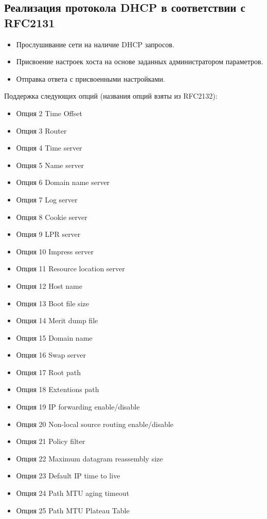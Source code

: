 \documentclass[14pt,a4paper]{extarticle}
\begin{document}
\subsection{Реализация протокола DHCP в соответствии с RFC2131}
\begin{itemize}
    \item Прослушивание сети на наличие DHCP запросов.
    \item Присвоение настроек хоста на основе заданных администратором параметров.
    \item Отправка ответа с присвоенными настройками.
\end{itemize}

Поддержка следующих опций (названия опций взяты из RFC2132):
\begin{itemize}
    \item Опция 2 Time Offset
    \item Опция 3 Router
    \item Опция 4 Time server
    \item Опция 5 Name server
    \item Опция 6 Domain name server
    \item Опция 7 Log server
    \item Опция 8 Cookie server
    \item Опция 9 LPR server
    \item Опция 10 Impress server
    \item Опция 11 Resource location server
    \item Опция 12 Host name
    \item Опция 13 Boot file size
    \item Опция 14 Merit dump file
    \item Опция 15 Domain name
    \item Опция 16 Swap server
    \item Опция 17 Root path
    \item Опция 18 Extentions path
    \item Опция 19 IP forwarding enable/disable
    \item Опция 20 Non-local source routing enable/disable
    \item Опция 21 Policy filter
    \item Опция 22 Maximum datagram reassembly size
    \item Опция 23 Default IP time to live
    \item Опция 24 Path MTU aging timeout
    \item Опция 25 Path MTU Plateau Table

\end{itemize}
\end{document}
